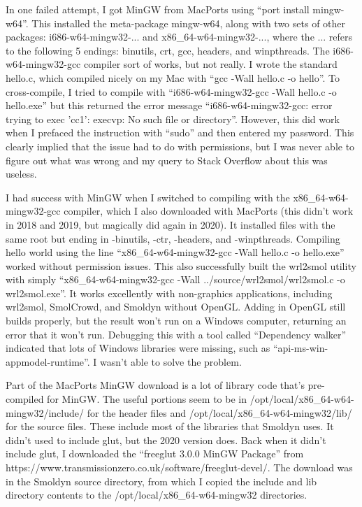 \documentclass {scrbook}
\begin{document}
In one failed attempt, I got MinGW from MacPorts using ``port install mingw-w64''. This installed the meta-package mingw-w64, along with two sets of other packages: i686-w64-mingw32-... and x86\_64-w64-mingw32-..., where the ... refers to the following 5 endings: binutils, crt, gcc, headers, and winpthreads. The i686-w64-mingw32-gcc compiler sort of works, but not really. I wrote the standard hello.c, which compiled nicely on my Mac with ``gcc -Wall hello.c -o hello''. To cross-compile, I tried to compile with ``i686-w64-mingw32-gcc -Wall hello.c -o hello.exe'' but this returned the error message ``i686-w64-mingw32-gcc: error trying to exec 'cc1': execvp: No such file or directory''. However, this did work when I prefaced the instruction with ``sudo'' and then entered my password. This clearly implied that the issue had to do with permissions, but I was never able to figure out what was wrong and my query to Stack Overflow about this was useless.

I had success with MinGW when I switched to compiling with the x86\_64-w64-mingw32-gcc compiler, which I also downloaded with MacPorts (this didn't work in 2018 and 2019, but magically did again in 2020). It installed files with the same root but ending in -binutils, -ctr, -headers, and -winpthreads. Compiling hello world using the line ``x86\_64-w64-mingw32-gcc -Wall hello.c -o hello.exe'' worked without permission issues. This also successfully built the wrl2smol utility with simply ``x86\_64-w64-mingw32-gcc -Wall ../source/wrl2smol/wrl2smol.c -o wrl2smol.exe''. It works excellently with non-graphics applications, including wrl2smol, SmolCrowd, and Smoldyn without OpenGL. Adding in OpenGL still builds properly, but the result won't run on a Windows computer, returning an error that it won't run. Debugging this with a tool called ``Dependency walker'' indicated that lots of Windows libraries were missing, such as ``api-ms-win-appmodel-runtime''. I wasn't able to solve the problem.

Part of the MacPorts MinGW download is a lot of library code that's pre-compiled for MinGW. The useful portions seem to be in /opt/local/x86\_64-w64-mingw32/include/ for the header files and /opt/local/x86\_64-w64-mingw32/lib/ for the source files. These include most of the libraries that Smoldyn uses. It didn't used to include glut, but the 2020 version does. Back when it didn't include glut, I downloaded the ``freeglut 3.0.0 MinGW Package'' from https://www.transmissionzero.co.uk/software/freeglut-devel/. The download was in the Smoldyn source directory, from which I copied the include and lib directory contents to the /opt/local/x86\_64-w64-mingw32 directories.
\end{document}
